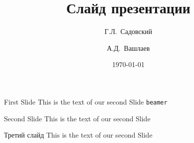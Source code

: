 \documentclass[aspectratio=169]{beamer} %
\begin{document}
\title{Слайд презентации}
\subtitle{}
\author[Садовский, Вашлаев]
{Г.Л.~Садовский \and А.Д.~Вашлаев}


\date{\today}
\subject{Дисциплина}


    
\begin{frame}{}
\titlepage
\end{frame}

\begin{frame}[c]{First Slide}
    This is the text of our second Slide \texttt{beamer}
\end{frame}

\begin{frame}{Second Slide}
    This is the text of our second Slide
\end{frame}


\begin{frame}{Третий слайд}
    This is the text of our second Slide
\end{frame}
\end{document}
